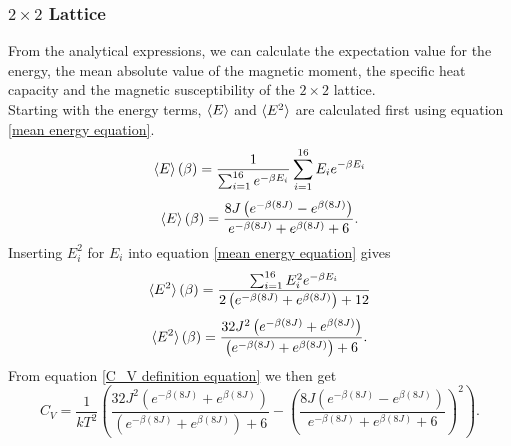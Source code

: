 \documentclass[10pt,a4paper]{article}
\begin{document}
\subsubsection{$2\times2$ Lattice}
From the analytical expressions, we can calculate the expectation value for the energy, the mean absolute value of the magnetic moment, the specific heat capacity and the magnetic susceptibility of the $2\times 2$ lattice.\\Starting with the energy terms, $\braket{E}$ and $\braket{E^2}$ are calculated first using equation \eqref{mean energy equation}.
\begin{equation*}
\braket{E}(\beta) = \frac{1}{\sum_{i=1}^{16} e^{-\beta E_i}} \sum_{i=1}^{16} E_ie^{-\beta E_i}
\end{equation*}
\begin{equation}
\braket{E}(\beta) = \frac{8J\left( e^{-\beta (8J)} -e^{\beta (8J)} \right)}{ e^{-\beta (8J)} +e^{\beta (8J)} +6}.
\end{equation}
Inserting $E_i^2$ for $E_i$ into equation \eqref{mean energy equation} gives
\begin{equation*}
\braket{E^2}(\beta) = \frac{\sum_{i=1}^{16} E_i^2e^{-\beta E_i}}{2\left( e^{-\beta (8J)} +e^{\beta (8J)} \right)+12}
\end{equation*}
\begin{equation}
\braket{E^2}(\beta) = \frac{32J^2\left( e^{-\beta (8J)} +e^{\beta (8J)} \right)}{\left( e^{-\beta (8J)} +e^{\beta (8J)} \right)+6}.
\end{equation}
From equation \eqref{C_V definition equation} we then get
\begin{equation}
C_V = \frac{1}{kT^2}\left( \frac{32J^2\left( e^{-\beta (8J)} +e^{\beta (8J)} \right)}{\left( e^{-\beta (8J)} +e^{\beta (8J)} \right)+6}  - \left( \frac{8J\left( e^{-\beta (8J)} -e^{\beta (8J)} \right)}{ e^{-\beta (8J)} +e^{\beta (8J)} +6} \right)^2 \right).
\end{equation}
\end{document}
